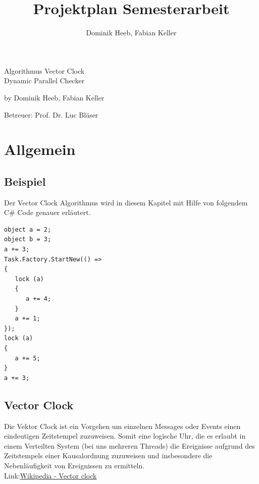 \documentclass[10pt,a4paper]{article}
\author{Dominik Heeb, Fabian Keller}
\title{Projektplan Semesterarbeit}
\begin{document}
\begin{titlepage}
	\begin{Huge}
		\begin{center}
				Algorithmus Vector Clock \\Dynamic Parallel Checker\\[2.0cm]
		\end{center}
	\end{Huge}
	
	\begin{center}
		\begin{Large}
				by Dominik Heeb, Fabian Keller\\[1.0cm]
		\end{Large}
		\begin{large}
				Betreuer: Prof. Dr. Luc Bläser
		\end{large}
	\end{center}
\end{titlepage}

\newpage
\tableofcontents 
\newpage

\section{Allgemein}

\subsection{Beispiel}
\begin{flushleft}
Der Vector Clock Algorithmus wird in diesem Kapitel mit Hilfe von folgendem C\# Code genauer erläutert.\\
\begin{lstlisting}
object a = 2;
object b = 3;
a += 3;
Task.Factory.StartNew(() =>
{
   lock (a)
   {
      a += 4; 
   }
   a += 1;
});
lock (a)
{
   a += 5; 
}
a += 3;
\end{lstlisting}
\end{flushleft}

\subsection{Vector Clock}
\begin{flushleft}
Die Vektor Clock ist ein Vorgehen um einzelnen Messages oder Events einen eindeutigen Zeitstempel zuzuweisen. Somit eine logische Uhr, die es erlaubt in einem Verteilten System (bei uns mehreren Threads) die Ereignisse aufgrund des Zeitstempels einer Kausalordnung zuzuweisen und insbesondere die Nebenläufigkeit von Ereignissen zu ermitteln.
\\[0.5cm]Link:\href{https://de.wikipedia.org/wiki/Vektoruhr}{Wikipedia - Vector clock}
\end{flushleft}
\end{document}
